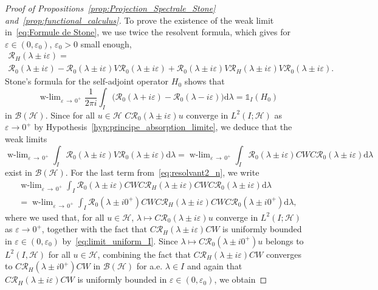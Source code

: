 \documentclass[10pt]{amsart}
\theoremstyle{definition}\newtheorem{defi}[theo]{Definition}\newtheorem{rema}[theo]{Remark}\newtheorem{exam}[theo]{Example}\newtheorem{exem}[theo]{Example}\newtheorem{nota}[theo]{Notation}
\newcommand{\Hi}{\mathcal{H}}
\newcommand{\rmd}{\mathrm{d}}
\newcommand{\Res}{\mathcal{R}}
\newcommand{\clB}{\mathcal{B}}
\DeclareMathOperator{\wlim}{w-lim}
\begin{document}
\begin{proof}[Proof of Propositions~\ref{prop:Projection_Spectrale_Stone} and~\ref{prop:functional_calculus}]
To prove the existence of the weak limit in~\eqref{eq:Formule de Stone}, we use twice the resolvent formula, which gives for $\varepsilon\in(0,\varepsilon_0)$, $\varepsilon_0>0$ small enough,
\begin{multline}\label{eq:resolvant2_n}
\Res_H(\lambda\pm i\varepsilon) =\\
\Res_0(\lambda\pm i\varepsilon)-\Res_0(\lambda\pm i\varepsilon)V\Res_0(\lambda\pm i\varepsilon)+\Res_0(\lambda\pm i\varepsilon)V\Res_H(\lambda\pm i\varepsilon)V\Res_0(\lambda\pm i\varepsilon)
.
\end{multline}
Stone's formula for the self-adjoint operator $H_0$ shows that
\begin{equation}\label{eq:Formule de Stone_for_H_0}
\wlim_{\varepsilon\,\rightarrow\,0^+}\frac{1}{2\pi i}\int_I\big(\Res_{0}(\lambda+i\varepsilon)-\Res_{0}(\lambda-i\varepsilon)\big)\rmd \lambda = \mathds{1}_{I}(H_0)
\end{equation}
in $\clB(\Hi)$. Since for all $u\in\mathcal{H}$ $C\Res_0(\lambda\pm i\varepsilon)u$ converge in $L^2(I;\Hi)$ as $\varepsilon\rightarrow 0^+$ by Hypothesis~\ref{hyp:principe_absorption_limite}, we deduce that the weak limits
\begin{equation}\label{eq:f1}
\wlim_{\varepsilon\,\rightarrow\,0^+}\int_I \Res_{0}(\lambda\pm i\varepsilon)V\Res_{0}(\lambda\pm i\varepsilon) \rmd \lambda = \wlim_{\varepsilon\,\rightarrow\,0^+}\int_I \Res_{0}(\lambda\pm i\varepsilon)CWC\Res_{0}(\lambda\pm i\varepsilon) \rmd \lambda
\end{equation}
exist in $\clB(\Hi)$. For the last term from~\eqref{eq:resolvant2_n}, we write
\begin{multline}\label{eq:f2}
\wlim_{\varepsilon\,\rightarrow\,0^+}\int_I \Res_0(\lambda\pm i\varepsilon)CWC\Res_H(\lambda\pm i\varepsilon)CWC\Res_0(\lambda\pm i\varepsilon) \rmd \lambda\\
= \wlim_{\varepsilon\,\rightarrow\,0^+}\int_I \Res_0(\lambda\pm i0^+)CWC\Res_H(\lambda\pm i\varepsilon)CWC\Res_0(\lambda\pm i0^+) \rmd \lambda, 
\end{multline}
where we used that, for all $u\in\Hi$, $\lambda\mapsto C\Res_0(\lambda\pm i\varepsilon)u$ converge in $L^2(I;\Hi)$ as $\varepsilon\rightarrow 0^+$, together with the fact that $C\Res_H(\lambda\pm i\varepsilon)CW$ is uniformly bounded in $\varepsilon\in(0,\varepsilon_0)$ by~\eqref{eq:limit_uniform_I}. Since $\lambda\mapsto C\Res_0(\lambda\pm i0^+)u$ belongs to $L^2(I,\Hi)$ for all $u\in \Hi$, combining the fact that $C\Res_H(\lambda\pm i\varepsilon)CW$ converges to $C\Res_H(\lambda\pm i0^+)CW$ in $\clB(\Hi)$ for a.e. $\lambda\in I$ and again that $C\Res_H(\lambda\pm i\varepsilon)CW$ is uniformly bounded in $\varepsilon\in(0,\varepsilon_0)$, we obtain

\end{proof}
\end{document}
